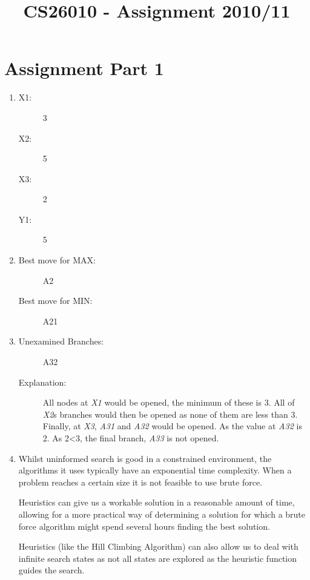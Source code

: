 \documentclass[10pt,letterpaper]{article}
\title{CS26010 - Assignment 2010/11}
\author{\name}
\begin{document}
  \maketitle
  \section{Assignment Part 1}
    \renewcommand{\labelenumi}{\textbf{\alph{enumi})}}
    \begin{enumerate}
    
    \item 
      \begin{description}
	\item[ X1:] 3
	\item[ X2:] 5
	\item[ X3:] 2
	\item[ Y1:] 5
      \end{description}
    \item 
      \begin{description}
	\item[ Best move for MAX:] A2
	\item[ Best move for MIN:] A21
      \end{description}
      
    \item 
      \begin{description}
	\item[ Unexamined Branches:] A32 
	\item[ Explanation:] All nodes at \emph{X1} would be opened, the minimum of these is 3. All of \emph{X2}s branches would then be opened as none of them are less than 3. Finally, at \emph{X3}, \emph{A31} and \emph{A32} would be opened. As the value at \emph{A32} is 2. As 2\textless  3, the final branch, \emph{A33} is not opened. 
      \end{description}
      
    \item Whilst uninformed search is good in a constrained environment, the algorithms it uses typically have an exponential time complexity. When a problem reaches a certain size it is not feasible to use brute force.
      
      Heuristics can give us a workable solution in a reasonable amount of time, allowing for a more practical way of determining a solution for which a brute force algorithm might spend several hours finding the best solution.
      
      Heuristics (like the Hill Climbing Algorithm) can also allow us to deal with infinite search states as not all states are explored as the heuristic function guides the search.
      

\end{enumerate}
\end{document}
